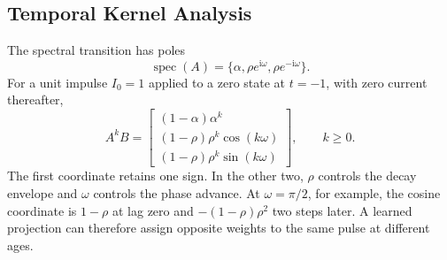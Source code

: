 \documentclass[letterpaper,journal]{IEEEtran}
\DeclareMathOperator{\spec}{spec}
\begin{document}
\subsection{Temporal Kernel Analysis}
\label{sec:kernels}

The spectral transition has poles
\begin{equation}
\spec(A)=\{\alpha,\rho e^{\mathrm i\omega},
                       \rho e^{-\mathrm i\omega}\}.
\label{eq:poles}
\end{equation}
For a unit impulse $I_0=1$ applied to a zero state at $t=-1$, with zero current thereafter,
\begin{equation}
A^kB=
\begin{bmatrix}
(1-\alpha)\alpha^k\\
(1-\rho)\rho^k\cos(k\omega)\\
(1-\rho)\rho^k\sin(k\omega)
\end{bmatrix},\qquad k\geq0.
\label{eq:impulse}
\end{equation}
The first coordinate retains one sign. In the other two, $\rho$ controls the decay envelope and $\omega$ controls the phase advance. At $\omega=\pi/2$, for example, the cosine coordinate is $1-\rho$ at lag zero and $-(1-\rho)\rho^2$ two steps later. A learned projection can therefore assign opposite weights to the same pulse at different ages.
\end{document}
